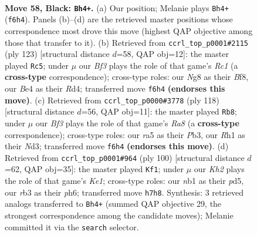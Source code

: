 \documentclass[11pt]{article}
\begin{document}
\clearpage

\begin{figure}[p]\centering
\begin{subfigure}{0.46\textwidth}\centering
\resizebox{\linewidth}{!}{%
\newchessgame
\chessboard[
  setfen={6n1/p6k/P4b1p/Rp3p2/1P2bP2/1R6/5K2/1N5r b - - 7 58},
  showmover=false,
  pgfstyle=straightmove, color=movearrow, markmove={f6-h4}
]}
\caption{}
\end{subfigure}\hfill
\begin{subfigure}{0.46\textwidth}\centering
\resizebox{\linewidth}{!}{%
\newchessgame
\chessboard[
  setfen={2r2bk1/6p1/3p2P1/1R1N1P2/p2r4/P4K2/8/1R6 b - - 3 62},
  showmover=false,
  pgfstyle=straightmove, color=movearrow, markmove={c8-c5}
]}
\caption{}
\end{subfigure}
\\[4pt]
\begin{subfigure}{0.46\textwidth}\centering
\resizebox{\linewidth}{!}{%
\newchessgame
\chessboard[
  setfen={R7/8/1br2np1/pp1kB3/5P2/1P1N1K2/P7/8 w - - 4 60},
  showmover=false,
  pgfstyle=straightmove, color=movearrow, markmove={a8-b8}
]}
\caption{}
\end{subfigure}\hfill
\begin{subfigure}{0.46\textwidth}\centering
\resizebox{\linewidth}{!}{%
\newchessgame
\chessboard[
  setfen={8/2b5/2Pr3p/3p1p2/3k1p2/5B1P/2R2PP1/4K3 w - - 4 51},
  showmover=false,
  pgfstyle=straightmove, color=movearrow, markmove={e1-f1}
]}
\caption{}
\end{subfigure}
\caption{\textbf{Move 58, Black: \texttt{Bh4+}.} (a) Our position; Melanie plays \texttt{Bh4+} (\texttt{f6h4}). Panels (b)--(d) are the retrieved master positions whose correspondence most drove this move (highest QAP objective among those that transfer to it). (b) Retrieved from \texttt{ccrl\_top\_p0001\#2115} (ply 123) [structural distance $d$=58, QAP obj=12]: the master played \texttt{Rc5}; under $\mu$ our \emph{Bf3} plays the role of that game's \emph{Rc1} (a \textbf{cross-type} correspondence); cross-type roles: our \emph{N}g8 as their \emph{B}f8, our \emph{B}e4 as their \emph{R}d4; transferred move \texttt{f6h4} \textbf{(endorses this move)}. (c) Retrieved from \texttt{ccrl\_top\_p0000\#3778} (ply 118) [structural distance $d$=56, QAP obj=11]: the master played \texttt{Rb8}; under $\mu$ our \emph{Bf3} plays the role of that game's \emph{Ra8} (a \textbf{cross-type} correspondence); cross-type roles: our \emph{r}a5 as their \emph{P}b3, our \emph{R}h1 as their \emph{N}d3; transferred move \texttt{f6h4} \textbf{(endorses this move)}. (d) Retrieved from \texttt{ccrl\_top\_p0001\#964} (ply 100) [structural distance $d$=62, QAP obj=35]: the master played \texttt{Kf1}; under $\mu$ our \emph{Kh2} plays the role of that game's \emph{Ke1}; cross-type roles: our \emph{n}b1 as their \emph{p}d5, our \emph{r}b3 as their \emph{p}h6; transferred move \texttt{h7h8}. Synthesis: 3 retrieved analogs transferred to \texttt{Bh4+} (summed QAP objective 29, the strongest correspondence among the candidate moves); Melanie committed it via the \texttt{search} selector.}
\label{fig:thought-m115}
\end{figure}
\end{document}

